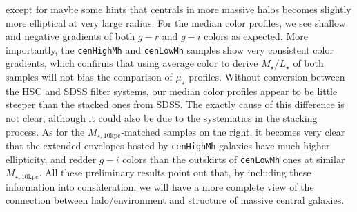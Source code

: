\documentclass{emulateapj}
\def\rbcg{\texttt{cenHighMh}}
\def\nbcg{\texttt{cenLowMh}}
\def\minn{{$M_{\star,10\mathrm{kpc}}$}}
\def\m2l{{$M_{\star}/L_{\star}$}}
\def\mden{{$\mu_{\star}$}}
\begin{document}
\begin{CJK*}{UTF8}{gbsn}
    except for maybe some hints that centrals in more massive halos becomes slightly 
    more elliptical at very large radius.  
    For the median color profiles, we see shallow and negative gradients of both 
    $g-r$ and $g-i$ colors as expected. 
    More importantly, the \rbcg{} and \nbcg{} samples show very consistent color 
    gradients, which confirms that using average color to derive \m2l{} of both 
    samples will not bias the comparison of \mden{} profiles.  
    Without conversion between the HSC and SDSS filter systems, our median color 
    profiles appear to be little steeper than the stacked ones from SDSS.  
    The exactly cause of this difference is not clear, although it could also be 
    due to the systematics in the stacking process. 
    As for the \minn{}-matched samples on the right, it becomes very clear that the 
    extended envelopes hosted by \rbcg{} galaxies have much higher ellipticity, and 
    redder $g-i$ colors than the outskirts of \nbcg{} ones at similar \minn{}.  
    All these preliminary results point out that, by including these information 
    into consideration, we will have a more complete view of the connection between 
    halo/environment and structure of massive central galaxies.    
    

\end{CJK*}
\end{document}
